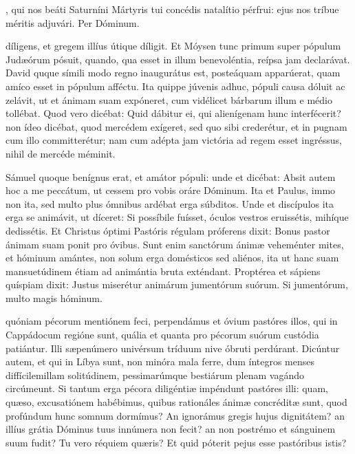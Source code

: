 \documentclass[fontsize=9pt,paper=A6,twoside,BCOR=1mm,DIV=22,headinclude]{scrarticle}
\begin{document}
\begin{multicols}{2}
{\Te 




\AiM 

\VRMi 

, qui nos beáti Saturníni Mártyris tui concédis natalítio pérfrui: ejus nos tríbue méritis adjuvári. Per Dóminum.

}

 díligens, et gregem illíus útique díligit. Et Móysen tunc primum super pópulum Judæórum pósuit, quando, qua esset in illum benevoléntia, reípsa jam declarávat. David quque símili modo regno inaugurátus est, posteáquam apparúerat, quam amíco esset in pópulum afféctu. Ita quippe júvenis adhuc, pópuli causa dóluit ac zelávit, ut et ánimam suam expóneret, cum vidélicet bárbarum illum e médio tollébat. Quod vero dicébat: Quid dábitur ei, qui alienígenam hunc interfécerit? non ídeo dicébat, quod mercédem exígeret, sed quo sibi crederétur, et in pugnam cum illo committerétur; nam cum adépta jam victória ad regem esset ingréssus, nihil de mercéde méminit.

\RVCPiv 


 Sámuel quoque benígnus erat, et amátor pópuli: unde et dicébat: Absit autem hoc a me peccátum, ut cessem pro vobis oráre Dóminum. Ita et Paulus, immo non ita, sed multo plus ómnibus ardébat erga súbditos. Unde et discípulos ita erga se animávit, ut díceret: Si possíbile fuísset, óculos vestros eruissétis, mihíque dedissétis. Et Christus óptimi Pastóris régulam próferens dixit: Bonus pastor ánimam suam ponit pro óvibus. Sunt enim sanctórum ánimæ veheménter mites, et hóminum amántes, non solum erga domésticos sed aliénos, ita ut hanc suam mansuetúdinem étiam ad animántia bruta exténdant. Proptérea et sápiens quíspiam dixit: Justus miserétur animárum jumentórum suórum. Si jumentórum, multo magis hóminum.

\RVCPv 

 quóniam pécorum mentiónem feci, perpendámus et óvium pastóres illos, qui in Cappádocum regióne sunt, quália et quanta pro pécorum suórum custódia patiántur. Illi sæpenúmero univérsum tríduum nive óbruti perdúrant. Dicúntur autem, et qui in Líbya sunt, non minóra mala ferre, dum íntegros menses diffícilemillam solitúdinem, pessimarúmque bestiárum plenam vagándo circúmeunt. Si tantum erga pécora diligéntiæ impéndunt pastóres illi: quam, quæso, excusatiónem habébimus, quibus rationáles ánimæ concréditæ sunt, quod profúndum hunc somnum dormímus? An ignorámus gregis hujus dignitátem? an illíus grátia Dóminus tuus innúmera non fecit? an non postrémo et sánguinem suum fudit? Tu vero réquiem quæris? Et quid póterit pejus esse pastóribus istis?


\end{multicols}
\end{document}
